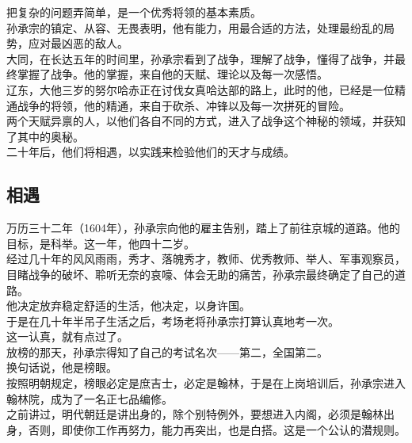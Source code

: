 \begin{multicols}{\theparacolNo}
把复杂的问题弄简单，是一个优秀将领的基本素质。\\

孙承宗的镇定、从容、无畏表明，他有能力，用最合适的方法，处理最纷乱的局势，应对最凶恶的敌人。\\

大同，在长达五年的时间里，孙承宗看到了战争，理解了战争，懂得了战争，并最终掌握了战争。他的掌握，来自他的天赋、理论以及每一次感悟。\\

辽东，大他三岁的努尔哈赤正在讨伐女真哈达部的路上，此时的他，已经是一位精通战争的将领，他的精通，来自于砍杀、冲锋以及每一次拼死的冒险。\\

两个天赋异禀的人，以他们各自不同的方式，进入了战争这个神秘的领域，并获知了其中的奥秘。\\

二十年后，他们将相遇，以实践来检验他们的天才与成绩。\\

\subsection{相遇}
万历三十二年（1604年），孙承宗向他的雇主告别，踏上了前往京城的道路。他的目标，是科举。这一年，他四十二岁。\\

经过几十年的风风雨雨，秀才、落魄秀才，教师、优秀教师、举人、军事观察员，目睹战争的破坏、聆听无奈的哀嚎、体会无助的痛苦，孙承宗最终确定了自己的道路。\\

他决定放弃稳定舒适的生活，他决定，以身许国。\\

于是在几十年半吊子生活之后，考场老将孙承宗打算认真地考一次。\\

这一认真，就有点过了。\\

放榜的那天，孙承宗得知了自己的考试名次——第二，全国第二。\\

换句话说，他是榜眼。\\

按照明朝规定，榜眼必定是庶吉士，必定是翰林，于是在上岗培训后，孙承宗进入翰林院，成为了一名正七品编修。\\

之前讲过，明代朝廷是讲出身的，除个别特例外，要想进入内阁，必须是翰林出身，否则，即使你工作再努力，能力再突出，也是白搭。这是一个公认的潜规则。\\


\end{multicols}
